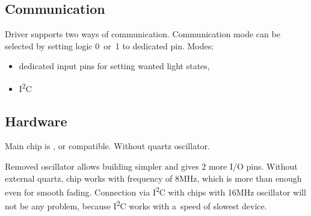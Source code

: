 
\subsection{Communication}
Driver supports two ways of communication. Communication mode can be selected by setting logic 0~or~1 to dedicated pin.
\newline
Modes:
\begin{itemize}
	\item dedicated input pins for setting wanted light states,
	\item I\textsuperscript{2}C
\end{itemize}


\subsection{Hardware}
Main chip is , or compatible. Without quartz oscillator.

Removed oscillator allows building simpler and gives 2 more I/O pins. Without external quartz, chip works with frequency of 8MHz, which is more than enough
even for smooth fading. Connection via I\textsuperscript{2}C with chips with 16MHz oscillator will not be any problem, because I\textsuperscript{2}C works
with a~speed of slowest device.
